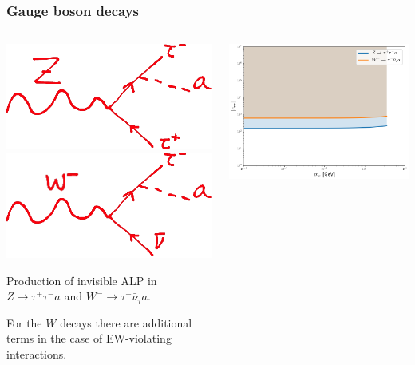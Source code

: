 \documentclass[mathserif, 10pt, aspectratio=169]{beamer}
\begin{document}
\begin{frame}\frametitle{Gauge boson decays}
    \begin{columns}
        \begin{column}{0.5\textwidth}
            \begin{center}
                \includegraphics[width=0.4\columnwidth]{figures/diagZ.png}\hspace{5pt}\includegraphics[width=0.4\columnwidth]{figures/diagW.png}
            \end{center}
            Production of invisible ALP in $Z\to \tau^+\tau^- a$ and $W^-\to \tau^- \bar{\nu}_\tau a$.

            For the $W$ decays there are additional terms in the case of EW-violating interactions.
        \end{column}
        \begin{column}{0.47\textwidth}
            \includegraphics[width=\columnwidth]{figures/boson_decay.png}
        \end{column}
    \end{columns}
    
\end{frame}
\end{document}
